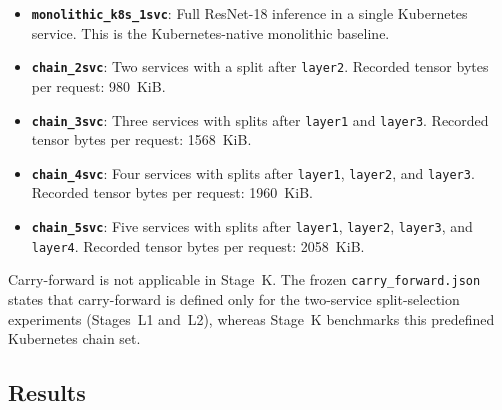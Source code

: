 \begin{itemize}
    \item \textbf{\texttt{monolithic\_k8s\_1svc}}: Full ResNet-18 inference in a single Kubernetes service. This is the Kubernetes-native monolithic baseline.
    \item \textbf{\texttt{chain\_2svc}}: Two services with a split after \texttt{layer2}. Recorded tensor bytes per request: 980~KiB.
    \item \textbf{\texttt{chain\_3svc}}: Three services with splits after \texttt{layer1} and \texttt{layer3}. Recorded tensor bytes per request: 1568~KiB.
    \item \textbf{\texttt{chain\_4svc}}: Four services with splits after \texttt{layer1}, \texttt{layer2}, and \texttt{layer3}. Recorded tensor bytes per request: 1960~KiB.
    \item \textbf{\texttt{chain\_5svc}}: Five services with splits after \texttt{layer1}, \texttt{layer2}, \texttt{layer3}, and \texttt{layer4}. Recorded tensor bytes per request: 2058~KiB.
\end{itemize}

Carry-forward is not applicable in Stage~K. The frozen \texttt{carry\_forward.json}
states that carry-forward is defined only for the two-service split-selection experiments
(Stages~L1 and~L2), whereas Stage~K benchmarks this predefined Kubernetes chain set.

\subsection{Results}

\begin{table}[ht]
\centering
\caption[Stage~K latency and overhead summary]{Stage~K summary of mean latency and overhead vs.\ Kubernetes monolithic baseline. Source: \texttt{merged\_results/condition\_summaries.csv} in \texttt{rq1\_4\_fully\_controlled\_20260515\_141036}.}
\label{tab:rq14_results}
\end{table}

